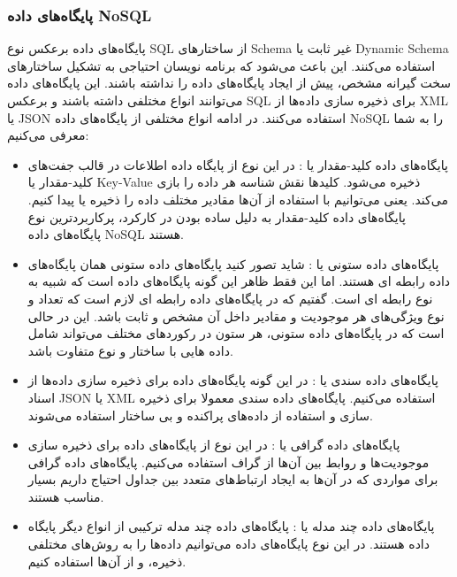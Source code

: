 \subsubsection{پایگاه‌های داده NoSQL}
پایگاه‌های داده
  برعکس نوع SQL از ساختارهای Schema غیر ثابت یا
Dynamic Schema
 استفاده می‌کنند. این باعث می‌شود که برنامه نویسان احتیاجی به تشکیل ساختارهای سخت گیرانه مشخص، پیش از ایجاد پایگاه‌های داده را نداشته باشند. این پایگاه‌های داده می‌توانند انواع مختلفی داشته باشند و برعکس SQL برای ذخیره سازی داده‌ها از XML یا JSON استفاده می‌کنند. در ادامه انواع مختلفی از پایگاه‌های داده NoSQL را به شما معرفی می‌کنیم:
\begin{itemize}
	\item
پایگاه‌های داده کلید-مقدار یا
: در این نوع از پایگاه داده اطلاعات در قالب جفت‌های کلید-مقدار یا Key-Value ذخیره می‌شود. کلیدها نقش شناسه هر داده را بازی می‌کند. یعنی می‌توانیم با استفاده از آن‌ها مقادیر مختلف داده را ذخیره یا پیدا کنیم. پایگاه‌های داده کلید-مقدار به دلیل ساده بودن در کارکرد، پرکاربرد‌ترین نوع پایگاه‌های داده NoSQL هستند.
\item
پایگاه‌های داده ستونی یا
: شاید تصور کنید پایگاه‌های داده ستونی همان پایگاه‌های داده رابطه ای هستند. اما این فقط ظاهر این گونه پایگاه‌های داده است که شبیه به نوع رابطه ای است. گفتیم که در پایگاه‌های داده رابطه ای لازم است که تعداد و نوع ویژگی‌های هر موجودیت و مقادیر داخل آن مشخص و ثابت باشد. این در حالی است که در پایگاه‌های داده ستونی، هر ستون در رکوردهای مختلف می‌تواند شامل داده هایی با ساختار و نوع متفاوت باشد.
\item
پایگاه‌های داده سندی یا
: در این گونه پایگاه‌های داده برای ذخیره سازی داده‌ها از اسناد JSON یا XML استفاده می‌کنیم. پایگاه‌های داده سندی معمولا برای ذخیره سازی و استفاده از داده‌های پراکنده و بی ساختار استفاده می‌شوند.
\item
پایگاه‌های داده گرافی یا
: در این نوع از پایگاه‌های داده برای ذخیره سازی موجودیت‌ها و روابط بین آن‌ها از گراف استفاده می‌کنیم. پایگاه‌های داده گرافی برای مواردی که در آن‌ها به ایجاد ارتباط‌های متعدد بین جداول احتیاج داریم بسیار مناسب هستند.
\item
پایگاه‌های داده چند مدله یا
: پایگاه‌های داده چند مدله ترکیبی از انواع دیگر پایگاه داده هستند. در این نوع پایگاه‌های داده می‌توانیم داده‌ها را به روش‌های مختلفی ذخیره، و از آن‌ها استفاده کنیم.

\end{itemize}

